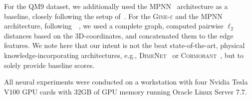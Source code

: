 \documentclass{article}
\theoremstyle{definition}
\begin{document}
For the \textsc{QM9} dataset, we additionally used the \textsc{MPNN}~\cite{Gil+2017} architecture as a baseline, closely following the setup of~\cite{Gil+2017}. For the \textsc{Gine-$\varepsilon$}  and the \textsc{MPNN} architecture, following~\citeauthor{Gil+2017}~\cite{Gil+2017}, we used a complete graph, computed pairwise $\ell_2$ distances based on the 3D-coordinates, and concatenated them to the edge features. We note here that our intent is not the beat state-of-the-art, physical knowledge-incorporating architectures, e.g., \textsc{DimeNet}~\cite{Kli+2020} or \textsc{Cormorant}~\cite{And+2019}, but to solely provide baseline scores. 

All neural experiments were conducted on a workstation with four Nvidia Tesla V100 GPU cards with 32GB of GPU memory running Oracle Linux Server 7.7.
\end{document}
